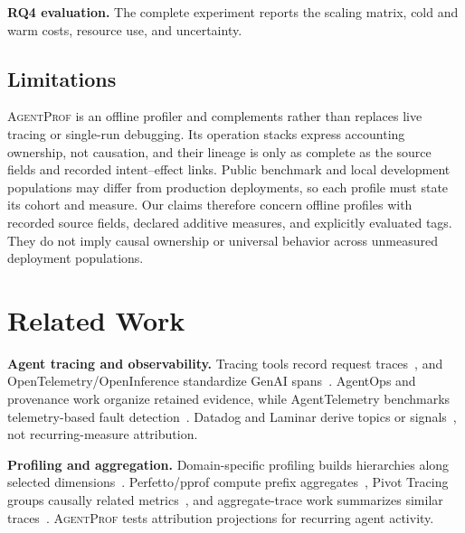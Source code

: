 \documentclass[letterpaper]{article}
\newcommand{\sys}{\textsc{AgentProf}\xspace}
\begin{document}
\textbf{RQ4 evaluation.} The complete experiment reports the
scaling matrix, cold and warm costs, resource use, and uncertainty.

\subsection{Limitations}

\sys is an offline profiler and complements rather than replaces live tracing
or single-run debugging. Its operation stacks express accounting ownership,
not causation, and their lineage is only as complete as the source fields and
recorded intent--effect links. Public benchmark and local development
populations may differ from production deployments, so each profile must state
its cohort and measure. Our claims therefore concern offline profiles with
recorded source fields, declared additive measures, and explicitly evaluated
tags. They do not imply causal ownership or universal behavior
across unmeasured deployment populations.

\section{Related Work}

\textbf{Agent tracing and observability.}
Tracing tools record request traces~\cite{langsmith,langfuse,phoenix},
and OpenTelemetry/OpenInference standardize GenAI
spans~\cite{otel,openinference}. AgentOps and provenance work organize
retained evidence, while AgentTelemetry benchmarks telemetry-based fault
detection~\cite{agentops,agenttraces-trust,agenttelemetry}. Datadog and
Laminar derive topics or signals~\cite{datadog-llmobs,laminar-signals},
not recurring-measure attribution.

\textbf{Profiling and aggregation.}
Domain-specific profiling builds hierarchies along selected
dimensions~\cite{dsprofile}. Perfetto/pprof compute prefix
aggregates~\cite{perfetto,pprof}, Pivot Tracing groups causally related
metrics~\cite{pivottracing}, and aggregate-trace work summarizes similar
traces~\cite{aggregatetraces}. \sys tests attribution projections for
recurring agent activity.
\end{document}
